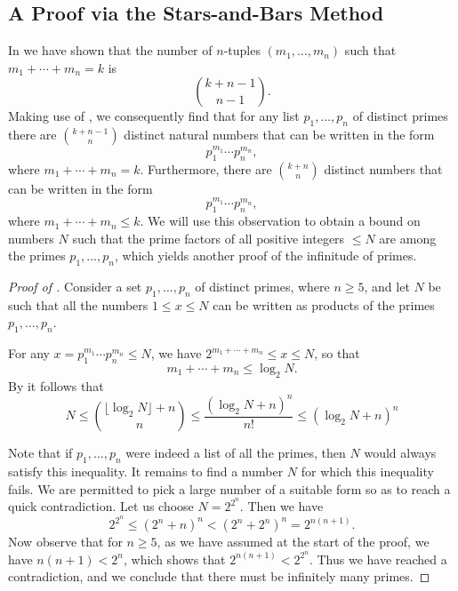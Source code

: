 \subsection{A Proof via the Stars-and-Bars Method}

In  we have shown that the number of $n$-tuples $(m_1,\ldots,m_n)$ such that $m_1+\cdots+m_n=k$ is
\begin{equation*}
  \binom{k+n-1}{n-1}.
\end{equation*}
Making use of , we consequently find that for any list $p_1,\ldots,p_n$ of distinct primes there are $\binom{k+n-1}{n}$ distinct natural numbers that can be written in the form
\begin{equation*}
  p_1^{m_1}\cdots p_n^{m_n},
\end{equation*}
where $m_1+\cdots+m_{n}=k$. Furthermore, there are $\binom{k+n}{n}$ distinct numbers that can be written in the form
\begin{equation*}
  p_1^{m_1}\cdots p_n^{m_n},
\end{equation*}
where $m_1+\cdots+m_{n} \leq k$. We will use this observation to obtain a bound on numbers $N$ such that the prime factors of all positive integers $\leq N$ are among the primes $p_1,\ldots,p_n$, which yields another proof of the infinitude of primes.

\begin{proof}[Proof of ]
  Consider a set $p_1,\ldots,p_n$ of distinct primes, where $n\geq 5$, and let $N$ be such that all the numbers $1\leq x\leq N$ can be written as products of the primes $p_1,\ldots,p_n$.

  For any $x=p_1^{m_1}\cdots p_n^{m_n}\leq N$, we have $2^{m_1+\cdots+m_n}\leq x\leq N$, so that
  \begin{equation*}
    m_1+\cdots+m_n \leq \log_2 N.
  \end{equation*}
  By  it follows that
  \begin{equation*}
    N\leq \binom{\lfloor\log_2 N\rfloor + n}{n}
    \leq \frac{(\log_2 N + n)^{n}}{n!}
    \leq (\log_2 N + n)^{n}
  \end{equation*}

  Note that if $p_1,\ldots,p_n$ were indeed a list of all the primes, then $N$ would always satisfy this inequality. It remains to find a number $N$ for which this inequality fails. We are permitted to pick a large number of a suitable form so as to reach a quick contradiction. Let us choose $N=2^{2^n}$. Then we have
  \begin{equation*}
    2^{2^n}\leq (2^n + n)^{n}<(2^n+2^n)^n=2^{n(n+1)}.
  \end{equation*}
  Now observe that for $n\geq 5$, as we have assumed at the start of the proof, we have $n(n+1)<2^n$, which shows that $2^{n(n+1)}<2^{2^n}$. Thus we have reached a contradiction, and we conclude that there must be infinitely many primes.
\end{proof}

